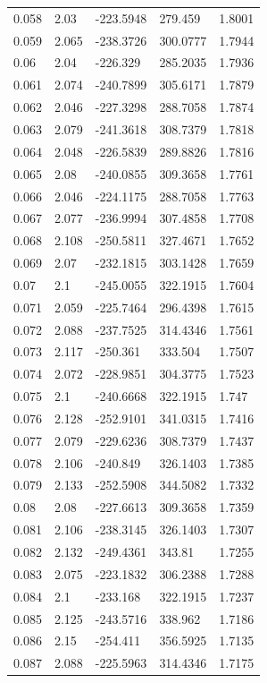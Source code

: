 \begin{tabular}{lllll}
0.058 & 2.03 & -223.5948 & 279.459 & 1.8001 \\
0.059 & 2.065 & -238.3726 & 300.0777 & 1.7944 \\
0.06 & 2.04 & -226.329 & 285.2035 & 1.7936 \\
0.061 & 2.074 & -240.7899 & 305.6171 & 1.7879 \\
0.062 & 2.046 & -227.3298 & 288.7058 & 1.7874 \\
0.063 & 2.079 & -241.3618 & 308.7379 & 1.7818 \\
0.064 & 2.048 & -226.5839 & 289.8826 & 1.7816 \\
0.065 & 2.08 & -240.0855 & 309.3658 & 1.7761 \\
0.066 & 2.046 & -224.1175 & 288.7058 & 1.7763 \\
0.067 & 2.077 & -236.9994 & 307.4858 & 1.7708 \\
0.068 & 2.108 & -250.5811 & 327.4671 & 1.7652 \\
0.069 & 2.07 & -232.1815 & 303.1428 & 1.7659 \\
0.07 & 2.1 & -245.0055 & 322.1915 & 1.7604 \\
0.071 & 2.059 & -225.7464 & 296.4398 & 1.7615 \\
0.072 & 2.088 & -237.7525 & 314.4346 & 1.7561 \\
0.073 & 2.117 & -250.361 & 333.504 & 1.7507 \\
0.074 & 2.072 & -228.9851 & 304.3775 & 1.7523 \\
0.075 & 2.1 & -240.6668 & 322.1915 & 1.747 \\
0.076 & 2.128 & -252.9101 & 341.0315 & 1.7416 \\
0.077 & 2.079 & -229.6236 & 308.7379 & 1.7437 \\
0.078 & 2.106 & -240.849 & 326.1403 & 1.7385 \\
0.079 & 2.133 & -252.5908 & 344.5082 & 1.7332 \\
0.08 & 2.08 & -227.6613 & 309.3658 & 1.7359 \\
0.081 & 2.106 & -238.3145 & 326.1403 & 1.7307 \\
0.082 & 2.132 & -249.4361 & 343.81 & 1.7255 \\
0.083 & 2.075 & -223.1832 & 306.2388 & 1.7288 \\
0.084 & 2.1 & -233.168 & 322.1915 & 1.7237 \\
0.085 & 2.125 & -243.5716 & 338.962 & 1.7186 \\
0.086 & 2.15 & -254.411 & 356.5925 & 1.7135 \\
0.087 & 2.088 & -225.5963 & 314.4346 & 1.7175 \\

\end{tabular}
